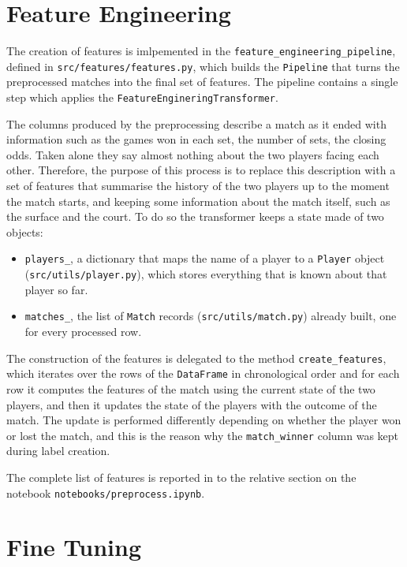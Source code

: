 \documentclass{article}
\begin{document}
\section{Feature Engineering}

The creation of features is imlpemented in the \texttt{feature\_engineering\_pipeline},
defined in \texttt{src/features/features.py}, which builds the \texttt{Pipeline} that turns the preprocessed matches 
into the final set of features. The pipeline
contains a single step which applies the
\texttt{FeatureEngineringTransformer}.

The columns produced by the preprocessing describe a match as it ended with information such as the games won in each set, the
number of sets, the closing odds. Taken alone they say almost nothing about the two players facing each other.
Therefore, the purpose of this process is to replace this description with a set of features that
summarise the history of the two players up to the moment the match starts, and keeping
some information about the match itself, such as the surface and the court. 
To do so the transformer keeps a state made of two objects:

\begin{itemize}
  \item \texttt{players\_}, a dictionary that maps the name of a player to a \texttt{Player} object
  (\texttt{src/utils/player.py}), which stores everything that is known about that player so far.
  \item \texttt{matches\_}, the list of \texttt{Match} records (\texttt{src/utils/match.py}) already built, one
  for every processed row.
\end{itemize}
\noindent
The construction of the features is delegated to the method \texttt{create\_features}, which iterates over the
rows of the \texttt{DataFrame} in chronological order and for each row it computes the features of the match 
using the current state of the two players, and then it updates the state of the players with the outcome of the match.
The update is performed differently depending on whether the player won or lost the match, and this is the 
reason why the \texttt{match\_winner} column was kept during
label creation.

The complete list of features is reported in to the relative section on the notebook \texttt{notebooks/preprocess.ipynb}.

\section{Fine Tuning}
\end{document}
